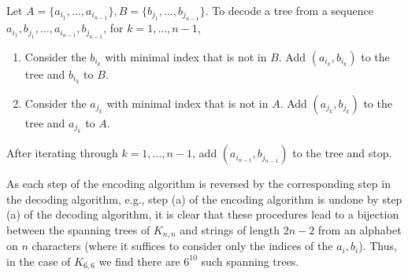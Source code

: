 \documentclass[10pt]{article}
\begin{document}
\begin{enumerate}
\par Let $A = \{a_{i_{1}}, \ldots, a_{i_{n-1}}\}, B = \{b_{j_{1}}, \ldots, b_{j_{n-1}}\}$. To decode a tree from a sequence $a_{i_{1}}, b_{j_{1}}, \ldots, a_{i_{n-1}}, b_{j_{n-1}}$, for $k=1, \ldots, n-1$,
\begin{enumerate}
	\item Consider the $b_{i_{k}}$ with minimal index that is not in $B$. Add $(a_{i_{k}}, b_{i_{k}})$ to the tree and $b_{i_{k}}$ to $B$.
	\item Consider the $a_{j_{k}}$ with minimal index that is not in $A$. Add $(a_{j_{k}}, b_{j_{k}})$ to the tree and $a_{j_{k}}$ to $A$.
\end{enumerate}
After iterating through $k=1, \ldots, n-1$, add $(a_{i_{n-1}}, b_{j_{n-1}})$ to the tree and stop.

\par As each step of the encoding algorithm is reversed by the corresponding step in the decoding algorithm, e.g., step (a) of the encoding algorithm is undone by step (a) of the decoding algorithm, it is clear that these procedures lead to a bijection between the spanning trees of $K_{n,n}$ and strings of length $2n-2$ from an alphabet on $n$ characters (where it suffices to consider only the indices of the $a_{i}, b_{i}$). Thus, in the case of $K_{6,6}$ we find there are $\boxed{6^{10}}$ such spanning trees.

\end{enumerate}
\end{document}
